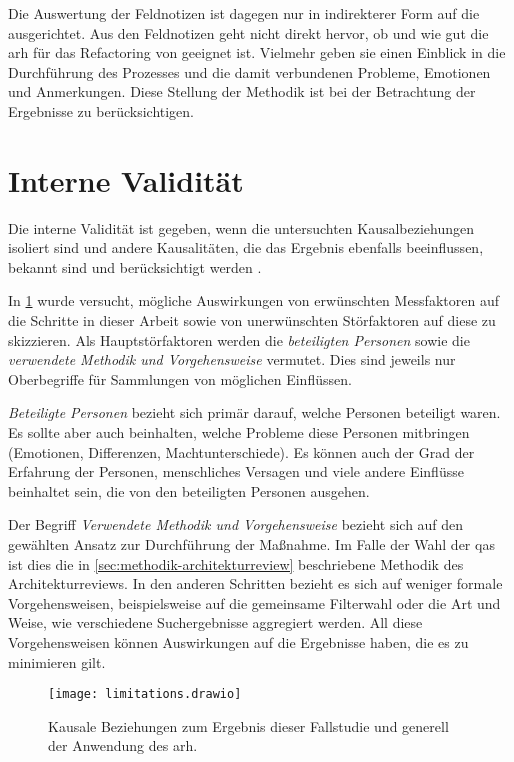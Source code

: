 Die Auswertung der Feldnotizen ist dagegen nur in indirekterer Form auf die \ff ausgerichtet.
Aus den Feldnotizen geht nicht direkt hervor, ob und wie gut die \gls{arh} für das Refactoring von \jf geeignet ist.
Vielmehr geben sie einen Einblick in die Durchführung des Prozesses und die damit verbundenen Probleme, Emotionen und Anmerkungen.
Diese Stellung der Methodik ist bei der Betrachtung der Ergebnisse zu berücksichtigen.

\section{Interne Validität}

Die interne Validität ist gegeben, wenn die untersuchten Kausalbeziehungen isoliert sind und andere Kausalitäten, die das Ergebnis ebenfalls beeinflussen, bekannt sind und berücksichtigt werden \cite{Runeson2009}.

In \cref{fig:limitations} wurde versucht, mögliche Auswirkungen von erwünschten Messfaktoren auf die Schritte in dieser Arbeit sowie von unerwünschten Störfaktoren auf diese zu skizzieren.
Als Hauptstörfaktoren werden die \emph{beteiligten Personen} sowie die \emph{verwendete Methodik und Vorgehensweise} vermutet.
Dies sind jeweils nur Oberbegriffe für Sammlungen von möglichen Einflüssen.

\emph{Beteiligte Personen} bezieht sich primär darauf, welche Personen beteiligt waren.
Es sollte aber auch beinhalten, welche Probleme diese Personen mitbringen (Emotionen, Differenzen, Machtunterschiede).
Es können auch der Grad der Erfahrung der Personen, menschliches Versagen und viele andere Einflüsse beinhaltet sein, die von den beteiligten Personen ausgehen.

Der Begriff \emph{Verwendete Methodik und Vorgehensweise} bezieht sich auf den gewählten Ansatz zur Durchführung der Maßnahme.
Im Falle der Wahl der \glspl{qa} ist dies die in \cref{sec:methodik-architekturreview} beschriebene Methodik des Architekturreviews.
In den anderen Schritten bezieht es sich auf weniger formale Vorgehensweisen, beispielsweise auf die gemeinsame Filterwahl oder die Art und Weise, wie verschiedene Suchergebnisse aggregiert werden.
All diese Vorgehensweisen können Auswirkungen auf die Ergebnisse haben, die es zu minimieren gilt.

\begin{figure}
	\centering
	\texttt{[image: limitations.drawio]}
	\caption[Kausale Beziehungen der Fallstudie]{
			Kausale Beziehungen zum Ergebnis dieser Fallstudie und generell der Anwendung des \gls{arh}.
		}
	\label{fig:limitations}
\end{figure}

